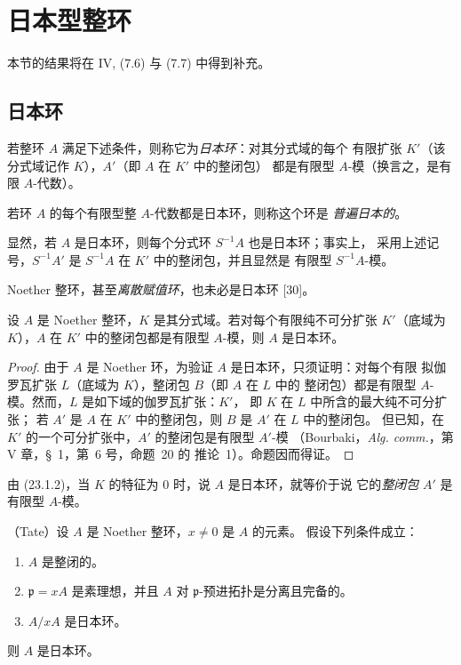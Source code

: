 \section{日本型整环}
\label{section:0.23-fr}

本节的结果将在 IV, (7.6) 与 (7.7) 中得到补充。

\subsection{日本环}
\label{subsection:0.23.1-fr}

\begin{definition}[23.1.1]
\label{0.23.1.1-fr}
若整环 $A$ 满足下述条件，则称它为\emph{日本环}：对其分式域的每个
有限扩张 $K'$（该分式域记作 $K$），$A'$（即 $A$ 在 $K'$ 中的整闭包）
都是有限型 $A$-模（换言之，是有限 $A$-代数）。


若环 $A$ 的每个有限型整 $A$-代数都是日本环，则称这个环是
\emph{普遍日本的}。
\end{definition}

显然，若 $A$ 是日本环，则每个分式环 $S^{-1}A$ 也是日本环；事实上，
采用上述记号，$S^{-1}A'$ 是 $S^{-1}A$ 在 $K'$ 中的整闭包，并且显然是
有限型 $S^{-1}A$-模。

Noether 整环，甚至\emph{离散赋值环}，也未必是日本环 [30]。

\begin{proposition}[23.1.2]
\label{0.23.1.2-fr}
设 $A$ 是 Noether 整环，$K$ 是其分式域。若对每个有限纯不可分扩张
$K'$（底域为 $K$），$A$ 在 $K'$ 中的整闭包都是有限型 $A$-模，则
$A$ 是日本环。
\end{proposition}

\begin{proof}
由于 $A$ 是 Noether 环，为验证 $A$ 是日本环，只须证明：对每个有限
拟伽罗瓦扩张 $L$（底域为 $K$），整闭包 $B$（即 $A$ 在 $L$ 中的
整闭包）都是有限型 $A$-模。然而，$L$ 是如下域的伽罗瓦扩张：$K'$，
即 $K$ 在 $L$ 中所含的最大纯不可分扩张；
若 $A'$ 是 $A$ 在 $K'$ 中的整闭包，则 $B$ 是 $A'$ 在 $L$ 中的整闭包。
但已知，在 $K'$ 的一个可分扩张中，$A'$ 的整闭包是有限型 $A'$-模
（Bourbaki，\emph{Alg. comm.}，第 V 章，§~1，第~6 号，命题~20 的
推论~1）。命题因而得证。
\end{proof}

由 (23.1.2)，当 $K$ 的特征为 $0$ 时，说 $A$ 是日本环，就等价于说
它的\emph{整闭包} $A'$ 是有限型 $A$-模。

\begin{theorem}[23.1.3]
\label{0.23.1.3-fr}
\textnormal{（Tate）}设 $A$ 是 Noether 整环，$x\neq0$ 是 $A$ 的元素。
假设下列条件成立：
\begin{enumerate}
  \item[(i)] $A$ 是整闭的。
  \item[(ii)] $\mathfrak p=xA$ 是素理想，并且 $A$ 对
  $\mathfrak p$-预进拓扑是分离且完备的。
  \item[(iii)] $A/xA$ 是日本环。
\end{enumerate}
则 $A$ 是日本环。
\end{theorem}

